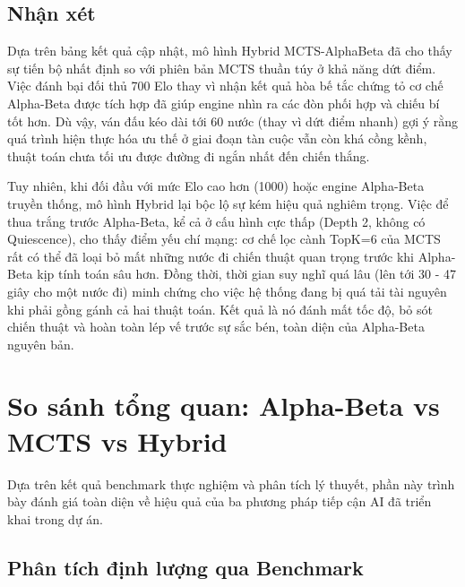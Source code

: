 \subsection{Nhận xét}

Dựa trên bảng kết quả cập nhật, mô hình Hybrid MCTS-AlphaBeta đã cho thấy sự tiến bộ nhất định so với phiên bản MCTS thuần túy ở khả năng dứt điểm. Việc đánh bại đối thủ 700 Elo thay vì nhận kết quả hòa bế tắc chứng tỏ cơ chế Alpha-Beta được tích hợp đã giúp engine nhìn ra các đòn phối hợp và chiếu bí tốt hơn. Dù vậy, ván đấu kéo dài tới 60 nước (thay vì dứt điểm nhanh) gợi ý rằng quá trình hiện thực hóa ưu thế ở giai đoạn tàn cuộc vẫn còn khá cồng kềnh, thuật toán chưa tối ưu được đường đi ngắn nhất đến chiến thắng.

Tuy nhiên, khi đối đầu với mức Elo cao hơn (1000) hoặc engine Alpha-Beta truyền thống, mô hình Hybrid lại bộc lộ sự kém hiệu quả nghiêm trọng. Việc để thua trắng trước Alpha-Beta, kể cả ở cấu hình cực thấp (Depth 2, không có Quiescence), cho thấy điểm yếu chí mạng: cơ chế lọc cành TopK=6 của MCTS rất có thể đã loại bỏ mất những nước đi chiến thuật quan trọng trước khi Alpha-Beta kịp tính toán sâu hơn. Đồng thời, thời gian suy nghĩ quá lâu (lên tới 30 - 47 giây cho một nước đi) minh chứng cho việc hệ thống đang bị quá tải tài nguyên khi phải gồng gánh cả hai thuật toán. Kết quả là nó đánh mất tốc độ, bỏ sót chiến thuật và hoàn toàn lép vế trước sự sắc bén, toàn diện của Alpha-Beta nguyên bản.

\section{So sánh tổng quan: Alpha-Beta vs MCTS vs Hybrid}

Dựa trên kết quả benchmark thực nghiệm và phân tích lý thuyết, phần này trình bày đánh giá toàn diện về hiệu quả của ba phương pháp tiếp cận AI đã triển khai trong dự án.

\subsection{Phân tích định lượng qua Benchmark}

